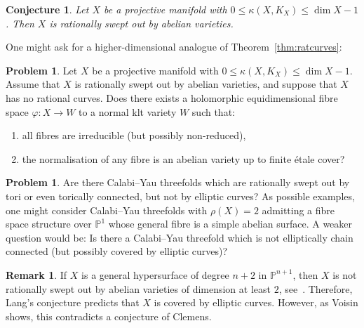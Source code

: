 \documentclass[11pt]{article}
\newtheorem{conj}[theo]{Conjecture}
\theoremstyle{definition}
\newtheorem{rema}[theo]{Remark}
\numberwithin{equation}{section}
\numberwithin{figure}{section}
\numberwithin{table}{section}
\newtheorem{problem}[theo]{Problem}}
\newcommand{\PS}{\mathbb{P}}
\newcommand*{\alphenumi}{\renewcommand*{\theenumi}{\alph{enumi}}}
\begin{document}
\begin{conj}\label{conj:main7.5}
Let $X$ be a projective manifold with $0 \leq \kappa (X,K_X)\leq \dim X - 1$. Then $X$ is rationally swept out by abelian varieties.
\end{conj}

One might ask for a higher-dimensional analogue of Theorem~\ref{thm:ratcurves}:

\begin{problem}\label{prob:main7.6}
Let $X$ be a projective manifold with $0 \leq \kappa (X,K_X) \leq \dim X - 1$. Assume that $X$ is rationally swept out by abelian varieties, and suppose that $X$ has no rational curves. Does there exists a holomorphic equidimensional fibre space $\varphi\colon X \to W $ to a normal klt variety $W$ such that:
\begin{enumerate}\alphenumi
\item \label{list-7.6.1}all fibres are irreducible (but possibly non-reduced),
\item \label{list-7.6.2}the normalisation of any fibre is an abelian variety up to finite étale cover?
\end{enumerate}
\end{problem}

\begin{problem}\label{prob:main7.7}
Are there Calabi--Yau threefolds which are rationally swept out by tori or even torically connected, but not by elliptic curves? As possible examples, one might consider Calabi--Yau threefolds with $\rho(X) = 2$ admitting a fibre space structure over $\PS^1$ whose general fibre is a simple abelian surface. A weaker question would be: Is there a Calabi--Yau threefold which is not elliptically chain connected (but possibly covered by elliptic curves)?
\end{problem}

\begin{rema}\label{rema:main7.8}
If $X$ is a general hypersurface of degree $n+2$ in $\PS^{n+1}$, then $X$ is not rationally swept out by abelian varieties of dimension at least $2$, see~\cite[Theorem~3.30]{Voi03}. Therefore, Lang's conjecture predicts that $X$ is covered by elliptic curves. However, as Voisin shows, this contradicts a conjecture of Clemens.
\end{rema}
\end{document}
